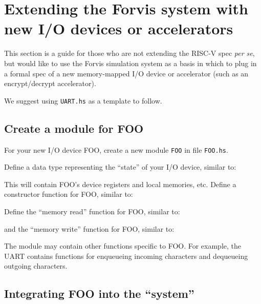 \documentclass[11pt]{article}
\begin{document}

\newpage

\section{Extending the Forvis system with new I/O devices or accelerators}

\label{sec_accelerators}

This section is a guide for those who are not extending the RISC-V
spec \emph{per se}, but would like to use the Forvis simulation system
as a basis in which to plug in a formal spec of a new memory-mapped
I/O device or accelerator (such as an encrypt/decrypt accelerator).

We suggest using \verb|UART.hs| as a template to follow.


\subsection{Create a module for FOO}

For your new I/O device FOO, create a new module \verb|FOO| in file
\verb|FOO.hs|.

Define a data type representing the ``state'' of your I/O device, similar to:



This will contain FOO's device registers and local memories, etc.
Define a constructor function for FOO, similar to:



Define the ``memory read'' function for FOO, similar to:



and the ``memory write'' function for FOO, similar to:



The module may contain other functions specific to FOO.  For example,
the UART contains functions for enqueueing incoming characters and
dequeueing outgoing characters.


\subsection{Integrating FOO into the ``system''}
\end{document}

